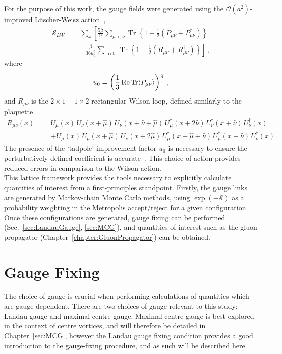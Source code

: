 For the purpose of this work, the gauge fields were generated using the $\mathcal{O}(a^2)$-improved L\"uscher-Weisz action~\cite{Luscher:1984xn}, 
%
\begin{align}
\mathcal{S} _ { LW } = &\sum_x \left[ \frac { 5 \beta } { 9 } \sum _ { \mu < \nu } \operatorname { Tr } \left\{ 1 - \frac { 1 } { 2 } \left( P _ { \mu \nu } + P _ { \mu \nu } ^ { \dagger } \right) \right\}\right. \nonumber\\
& \left.- \frac { \beta } { 36 u _ { 0 } ^ { 2 } } \sum _ { \text { rect } } \operatorname { Tr } \left\{ 1 - \frac { 1 } { 2 } \left( R _ { \mu \nu } + R _ { \mu \nu } ^ { \dagger } \right) \right\}\right]\, ,
\end{align}
%
where
\begin{equation}
u_0 = \left(\frac{1}{3}\operatorname{ Re } \operatorname{Tr}\langle P_{\mu\nu} \rangle\right)^{\frac{1}{4}}\, ,
\end{equation}
and $R_{\mu\nu}$ is the $2\times 1 + 1\times 2$ rectangular Wilson loop, defined similarly to the plaquette 
\begin{align}
 R _ { \mu \nu } ( x ) = \, &  U_\mu( x )\, U_\nu( x + \hat { \mu } )\, U_\nu( x + \hat { \nu } + \hat { \mu } )\, U_\mu^\dagger ( x + 2 \hat { \nu } )\, U _\nu^\dagger( x + \hat { \nu } )\, U_\nu^\dagger( x )\nonumber\\
&+ U_\mu ( x )\, U_\mu ( x + \hat{\mu} )\, U_\nu( x + 2 \hat { \mu } )\, U_\mu^\dagger ( x + \hat { \mu } + \hat { \nu } )\, U_\mu^\dagger ( x + \hat { \nu } )\, U_\nu^\dagger( x ) \, .
\end{align}
The presence of the `tadpole' improvement factor $u_0$ is necessary to ensure the perturbatively defined coefficient is accurate~\cite{Lepage:1992xa}. This choice of action provides reduced errors in comparison to the Wilson action.\\

This lattice framework provides the tools necessary to explicitly calculate quantities of interest from a first-principles standpoint. Firstly, the gauge links are generated by Markov-chain Monte Carlo methods, using $\exp\left(-\mathcal{S}\right)$ as a probability weighting in the Metropolis accept/reject for a given configuration. Once these configurations are generated, gauge fixing can be performed (Sec.~\ref{sec:LandauGauge}, \ref{sec:MCG}), and quantities of interest such as the gluon propagator (Chapter~\ref{chapter:GluonPropagator}) can be obtained.

\section{Gauge Fixing}
The choice of gauge is crucial when performing calculations of quantities which are gauge dependent. There are two choices of gauge relevant to this study: Landau gauge and maximal centre gauge. Maximal centre gauge is best explored in the context of centre vortices, and will therefore be detailed in Chapter~\ref{sec:MCG}, however the Landau gauge fixing condition provides a good introduction to the gauge-fixing procedure, and as such will be described here.

